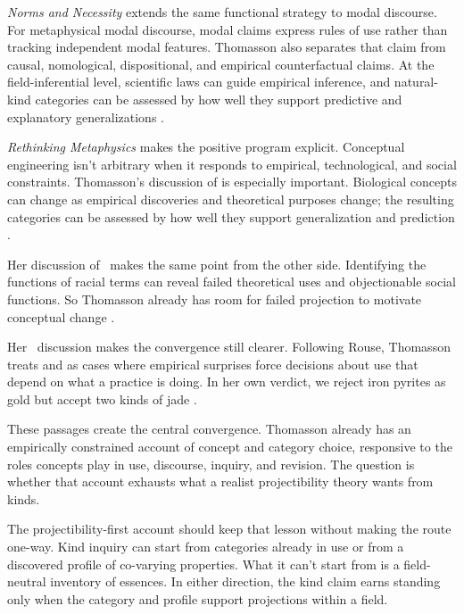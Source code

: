 \documentclass[12pt]{article}
\begin{document}
\emph{Norms and Necessity} extends the same functional strategy to modal discourse. For metaphysical modal discourse, modal claims express rules of use rather than tracking independent modal features. Thomasson also separates that claim from causal, nomological, dispositional, and empirical counterfactual claims. At the field-inferential level, scientific laws can guide empirical inference, and natural-kind categories can be assessed by how well they support predictive and explanatory generalizations \citep[121--123]{thomasson2020norms}.

\emph{Rethinking Metaphysics} makes the positive program explicit. Conceptual engineering isn't arbitrary when it responds to empirical, technological, and social constraints. Thomasson's discussion of  is especially important. Biological concepts can change as empirical discoveries and theoretical purposes change; the resulting categories can be assessed by how well they support generalization and prediction \citep[216--217]{thomasson2025rethink}.

Her discussion of\  makes the same point from the other side. Identifying the functions of racial terms can reveal failed theoretical uses and objectionable social functions. So Thomasson already has room for failed projection to motivate conceptual change \citep[210--213]{thomasson2025rethink}.

Her\  discussion makes the convergence still clearer. Following Rouse, Thomasson treats  and  as cases where empirical surprises force decisions about use that depend on what a practice is doing. In her own verdict, we reject iron pyrites as gold but accept two kinds of jade \citep[101--102]{thomasson2020norms}.

These passages create the central convergence. Thomasson already has an empirically constrained account of concept and category choice, responsive to the roles concepts play in use, discourse, inquiry, and revision. The question is whether that account exhausts what a realist projectibility theory wants from kinds.

The projectibility-first account should keep that lesson without making the route one-way. Kind inquiry can start from categories already in use or from a discovered profile of co-varying properties. What it can't start from is a field-neutral inventory of essences. In either direction, the kind claim earns standing only when the category and profile support projections within a field.
\end{document}
